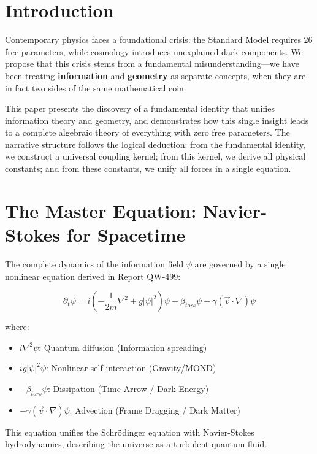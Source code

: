 \documentclass[11pt, a4paper]{article}
\begin{document}
\section{Introduction}

Contemporary physics faces a foundational crisis: the Standard Model requires 26 free parameters, while cosmology introduces unexplained dark components. We propose that this crisis stems from a fundamental misunderstanding—we have been treating \textbf{information} and \textbf{geometry} as separate concepts, when they are in fact two sides of the same mathematical coin.

This paper presents the discovery of a fundamental identity that unifies information theory and geometry, and demonstrates how this single insight leads to a complete algebraic theory of everything with zero free parameters. The narrative structure follows the logical deduction: from the fundamental identity, we construct a universal coupling kernel; from this kernel, we derive all physical constants; and from these constants, we unify all forces in a single equation.

\section{The Master Equation: Navier-Stokes for Spacetime}

The complete dynamics of the information field $\psi$ are governed by a single nonlinear equation derived in Report QW-499:

\begin{equation}
\partial_t \psi = i\left(-\frac{1}{2m}\nabla^2 + g|\psi|^2\right)\psi - \beta_{tors}\psi - \gamma(\vec{v}\cdot\nabla)\psi
\label{eq:master}
\end{equation}

where:
\begin{itemize}
    \item $i\nabla^2\psi$: Quantum diffusion (Information spreading)
    \item $ig|\psi|^2\psi$: Nonlinear self-interaction (Gravity/MOND)
    \item $-\beta_{tors}\psi$: Dissipation (Time Arrow / Dark Energy)
    \item $-\gamma(\vec{v}\cdot\nabla)\psi$: Advection (Frame Dragging / Dark Matter)
\end{itemize}
This equation unifies the Schrödinger equation with Navier-Stokes hydrodynamics, describing the universe as a turbulent quantum fluid.
\end{document}
